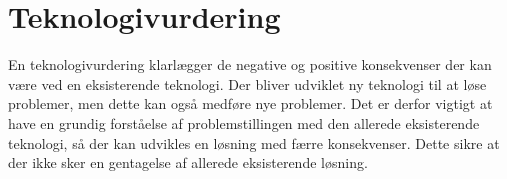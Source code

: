\section{Teknologivurdering}
En teknologivurdering klarlægger de negative og positive konsekvenser der kan være ved en eksisterende teknologi. Der bliver udviklet ny teknologi til at løse problemer, men dette kan også medføre nye problemer. Det er derfor vigtigt at have en grundig forståelse af problemstillingen med den allerede eksisterende teknologi, så der kan udvikles en løsning med færre konsekvenser. Dette sikre at der ikke sker en gentagelse af allerede eksisterende løsning. \citep{PeterLarsen, ProTek}



